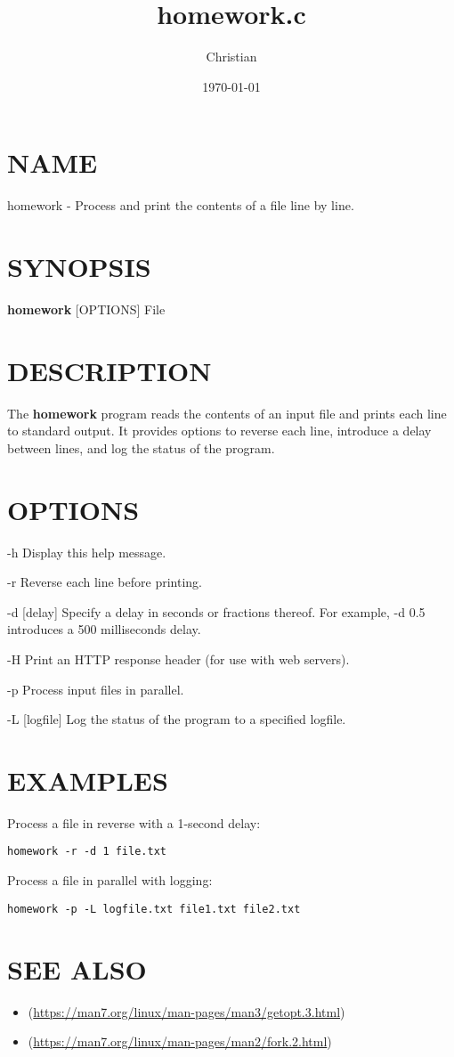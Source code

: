 \documentclass[11pt]{article}
\author{Christian}
\date{\today}
\title{homework.c}
\begin{document}
\section{NAME}
\label{sec:orga630cdb}
homework - Process and print the contents of a file line by line.
\section{SYNOPSIS}
\label{sec:orge87051a}
\textbf{\textbf{homework}} [OPTIONS] File
\section{DESCRIPTION}
\label{sec:org6b50d55}
The \textbf{\textbf{homework}} program reads the contents of an input file and prints each line to standard output. It provides options to reverse each line, introduce a delay between lines, and log the status of the program.
\section{OPTIONS}
\label{sec:org0ccb5ac}
-h
  Display this help message.

-r
  Reverse each line before printing.

-d [delay]
  Specify a delay in seconds or fractions thereof. For example, -d 0.5 introduces a 500 milliseconds delay.

-H
  Print an HTTP response header (for use with web servers).

-p
  Process input files in parallel.

-L [logfile]
  Log the status of the program to a specified logfile.
\section{EXAMPLES}
\label{sec:org0e6ec91}
Process a file in reverse with a 1-second delay:
\begin{verbatim}
homework -r -d 1 file.txt
\end{verbatim}

Process a file in parallel with logging:
\begin{verbatim}
homework -p -L logfile.txt file1.txt file2.txt
\end{verbatim}
\section{SEE ALSO}
\label{sec:org75279f5}
\begin{itemize}
\item\relax [getopt(3)](\url{https://man7.org/linux/man-pages/man3/getopt.3.html})
\item\relax [fork(2)](\url{https://man7.org/linux/man-pages/man2/fork.2.html})
\end{itemize}
\end{document}
